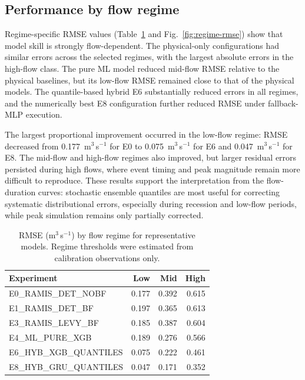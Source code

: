 \documentclass[a4paper,fleqn]{cas-sc}
\begin{document}
\subsection{Performance by flow regime}\label{subsec:regime-results}

Regime-specific RMSE values (Table~\ref{tab:regime-rmse} and
Fig.~\ref{fig:regime-rmse}) show that model skill is strongly
flow-dependent. The physical-only configurations had similar errors
across the selected regimes, with the largest absolute errors in the
high-flow class. The pure ML model reduced mid-flow RMSE relative to
the physical baselines, but its low-flow RMSE remained close to that of
the physical models. The quantile-based hybrid E6 substantially reduced
errors in all regimes, and the numerically best E8 configuration
further reduced RMSE under fallback-MLP execution.

The largest proportional improvement occurred in the low-flow regime:
RMSE decreased from 0.177~m$^3$\,s$^{-1}$ for E0 to
0.075~m$^3$\,s$^{-1}$ for E6 and 0.047~m$^3$\,s$^{-1}$ for E8. The
mid-flow and high-flow regimes also improved, but larger residual
errors persisted during high flows, where event timing and peak
magnitude remain more difficult to reproduce. These results support the
interpretation from the flow-duration curves: stochastic ensemble
quantiles are most useful for correcting systematic distributional
errors, especially during recession and low-flow periods, while peak
simulation remains only partially corrected.

\begin{table}[t]
\caption{RMSE (m$^3$\,s$^{-1}$) by flow regime for representative
models. Regime thresholds were estimated from calibration observations
only.}
\label{tab:regime-rmse}
\centering
\small
\begin{tabular*}{\linewidth}{@{\extracolsep{\fill}}lrrr@{}}
\toprule
Experiment & Low & Mid & High \\
\midrule
E0\_RAMIS\_DET\_NOBF   & 0.177 & 0.392 & 0.615 \\
E1\_RAMIS\_DET\_BF     & 0.197 & 0.365 & 0.613 \\
E3\_RAMIS\_LEVY\_BF    & 0.185 & 0.387 & 0.604 \\
E4\_ML\_PURE\_XGB      & 0.189 & 0.276 & 0.566 \\
E6\_HYB\_XGB\_QUANTILES & 0.075 & 0.222 & 0.461 \\
E8\_HYB\_GRU\_QUANTILES & 0.047 & 0.171 & 0.352 \\
\bottomrule
\end{tabular*}
\end{table}
\end{document}
